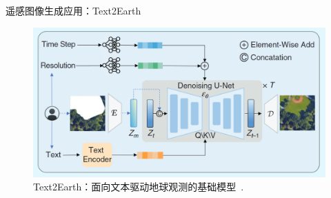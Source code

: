 


\begin{refsection}
  \begin{frame}{遥感图像生成应用：Text2Earth}
    \begin{figure}
      \centering
      \includegraphics[width=0.9\linewidth]{figs/text2earth.png}
      \caption[]{\scriptsize Text2Earth：面向文本驱动地球观测的基础模型~\parencite{text2earth2025}.}
    \end{figure}
    \bottomleftrefs
  \end{frame}
\end{refsection}

